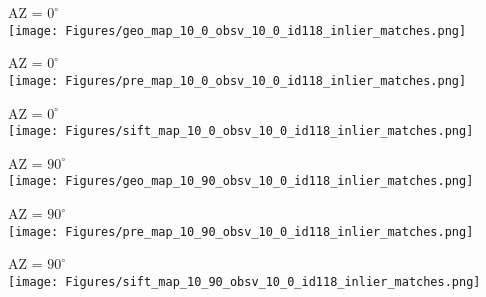 \begin{figure*}
\centering
{}
\vspace{0.5cm} 

\begin{minipage}[b]{0.3\linewidth}
    \centering
    AZ = $0^{\circ}$
    \vspace{5pt} \\
    \texttt{[image: Figures/geo\_map\_10\_0\_obsv\_10\_0\_id118\_inlier\_matches.png]}  
\end{minipage}
\begin{minipage}[b]{0.3\linewidth}
    \centering
    AZ = $0^{\circ}$
    \vspace{5pt} \\
    \texttt{[image: Figures/pre\_map\_10\_0\_obsv\_10\_0\_id118\_inlier\_matches.png]}   
\end{minipage}
\begin{minipage}[b]{0.3\linewidth}
    \centering
    AZ = $0^{\circ}$
    \vspace{5pt} \\
    \texttt{[image: Figures/sift\_map\_10\_0\_obsv\_10\_0\_id118\_inlier\_matches.png]}  
\end{minipage}
\begin{minipage}[b]{0.3\linewidth}
    \centering
     \vspace{5pt} 
    AZ = $90^{\circ}$
    \vspace{5pt} \\
    \texttt{[image: Figures/geo\_map\_10\_90\_obsv\_10\_0\_id118\_inlier\_matches.png]}
\end{minipage}
\begin{minipage}[b]{0.3\linewidth}
    \centering
     \vspace{5pt} 
    AZ = $90^{\circ}$
    \vspace{5pt} \\
    \texttt{[image: Figures/pre\_map\_10\_90\_obsv\_10\_0\_id118\_inlier\_matches.png]}   
\end{minipage}
\begin{minipage}[b]{0.3\linewidth}
    \vspace{5pt} 
    \centering   
    AZ = $90^{\circ}$
    \vspace{5pt} \\
    \texttt{[image: Figures/sift\_map\_10\_90\_obsv\_10\_0\_id118\_inlier\_matches.png]}

\end{minipage}
\end{figure*}
